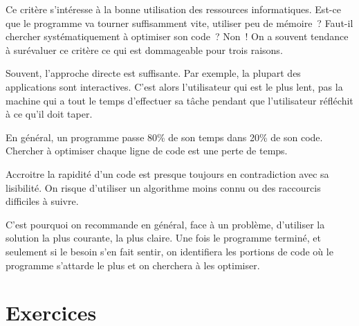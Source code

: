 		Ce critère s’intéresse à la bonne utilisation des
		ressources informatiques. Est-ce que le programme va tourner
		suffisamment vite, utiliser peu de mémoire~? Faut-il chercher
		systématiquement à optimiser son code~? Non~! On a souvent tendance à
		surévaluer ce critère ce qui est dommageable pour trois raisons.
	
		\begin{liste}
		\item
			Souvent, l’approche directe est suffisante. 
			Par exemple, la plupart des applications sont interactives.
			C’est alors l’utilisateur qui est le plus lent, 
			pas la machine qui a tout le temps d’effectuer sa tâche
			pendant que l’utilisateur réfléchit à ce qu’il doit taper.
		\item 
			En général, un programme passe 80\% de son temps dans 20\% de son code.
			Chercher à optimiser chaque ligne de code est une perte de temps.
		\item 
			Accroitre la rapidité d’un code est presque toujours 
			en contradiction avec sa lisibilité. 
			On risque d’utiliser un algorithme moins connu 
			ou des raccourcis difficiles à suivre.
		\end{liste}
	
		C’est pourquoi on recommande en général, face à un problème, 
		d’utiliser la solution la plus courante, la plus claire. 
		Une fois le programme terminé, 
		et seulement si le besoin s’en fait sentir, 
		on identifiera les portions de code où le programme s’attarde 
		le plus et on cherchera à les optimiser.
	
\section{Exercices}

